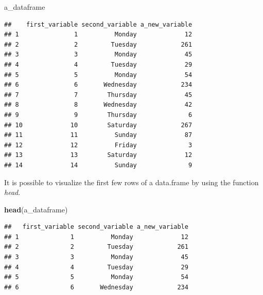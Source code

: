 \documentclass[
]{article}
\newenvironment{Shaded}{\begin{snugshade}}{\end{snugshade}}
\newcommand{\KeywordTok}[1]{\textcolor[rgb]{0.13,0.29,0.53}{\textbf{#1}}}
\newcommand{\NormalTok}[1]{#1}
\begin{document}
\begin{Shaded}
\begin{Highlighting}[]
\NormalTok{a_dataframe}
\end{Highlighting}
\end{Shaded}

\begin{verbatim}
##    first_variable second_variable a_new_variable
## 1               1          Monday             12
## 2               2         Tuesday            261
## 3               3          Monday             45
## 4               4         Tuesday             29
## 5               5          Monday             54
## 6               6       Wednesday            234
## 7               7        Thursday             45
## 8               8       Wednesday             42
## 9               9        Thursday              6
## 10             10        Saturday            267
## 11             11          Sunday             87
## 12             12          Friday              3
## 13             13        Saturday             12
## 14             14          Sunday              9
\end{verbatim}

It is possible to visualize the first few rows of a data.frame by using the function \emph{head}.

\begin{Shaded}
\begin{Highlighting}[]
\KeywordTok{head}\NormalTok{(a_dataframe)}
\end{Highlighting}
\end{Shaded}

\begin{verbatim}
##   first_variable second_variable a_new_variable
## 1              1          Monday             12
## 2              2         Tuesday            261
## 3              3          Monday             45
## 4              4         Tuesday             29
## 5              5          Monday             54
## 6              6       Wednesday            234
\end{verbatim}
\end{document}
